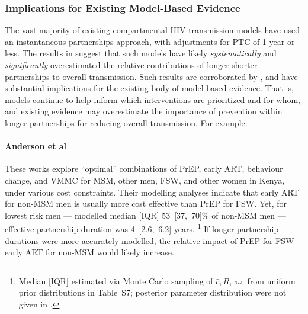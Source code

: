 \subsubsection{Implications for Existing Model-Based Evidence}\label{foi.disc.bip.evid}
The vast majority of existing compartmental HIV transmission models
have used an instantaneous partnerships approach,
with adjustments for PTC of 1-year or less.
The results in  suggest that such models
have likely \emph{systematically} and \emph{significantly} overestimated
the relative contributions of longer \vs shorter partnerships to overall transmission.
Such results are corroborated by \cite{Johnson2016mf},
and have substantial implications for the existing body of model-based evidence.
That is, models continue to help inform which interventions are prioritized and for whom,
and existing evidence may overestimate the importance of prevention within longer partnerships
for reducing overall transmission. For example:
\paragraph{Anderson et al}\cite{Anderson2014,Anderson2017,Anderson2018}
These works explore ``optimal'' combinations of PrEP, early ART, behaviour change, and VMMC
for MSM, other men, FSW, and other women in Kenya, under various cost constraints.
Their modelling analyses indicate that
early ART for non-MSM men is usually more cost effective than PrEP for FSW.
Yet, for lowest risk men --- modelled median [IQR] 53~[37,~70]\% of non-MSM men ---
effective partnership duration was 4~[2.6,~6.2] years.%
\footnote{Median [IQR] estimated via Monte Carlo sampling of $\bar{c}, R, \varpi$
  from uniform prior distributions in Table~S7;
  posterior parameter distribution were not given in \cite{Anderson2014}.}
If longer partnership durations were more accurately modelled,
the relative impact of PrEP for FSW \vs early ART for non-MSM would likely increase.
